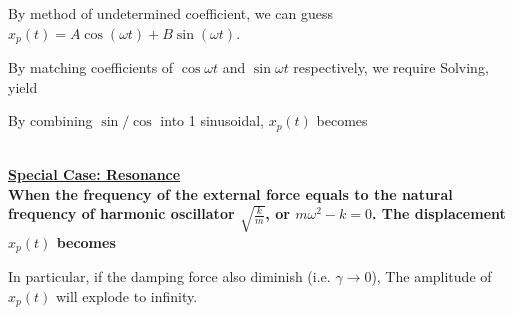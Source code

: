\documentclass[class=article, crop=false, 12pt]{standalone}
\begin{document}
By method of undetermined coefficient, 
we can guess $x_p(t) = A\cos{(\omega t)} + B\sin{(\omega t)}$.

By matching coefficients of $\cos{\omega t}$ and $\sin{\omega t}$ respectively, we require
Solving, yield

By combining $\sin/\cos$ into 1 sinusoidal, $x_p(t)$ becomes

\hfill\\[1em]
\bf{\ul{Special Case: Resonance}}\\

When the frequency of the external force equals to the natural frequency of harmonic oscillator $\sqrt{\frac{k}{m}}$, 
or $m\omega^2 -k = 0$. 
The displacement $x_p(t)$ becomes

In particular, if the damping force also diminish (i.e. $\gamma \to 0$), 
The amplitude of $x_p(t)$ will explode to infinity. 

\theend
\end{document}
